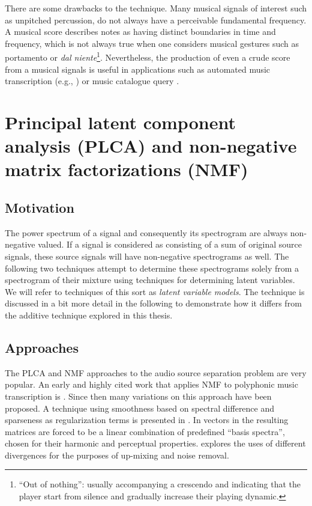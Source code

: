 There are some drawbacks to the technique. Many musical signals of interest such
as unpitched percussion, do not always have a perceivable fundamental
frequency. A musical score describes notes as having distinct boundaries in time
and frequency, which is not always true when one considers
musical gestures such as portamento or \textit{dal niente}\footnote{``Out of
    nothing'': usually accompanying a crescendo and indicating that the player
start from silence and gradually increase their playing dynamic.}. Nevertheless,
the production of even a crude score from a musical signals is useful in
applications such as automated music transcription (e.g.,
\cite{ryynanen2008automatic}) or music catalogue query
\cite{mcnab1996towards}.

\section{Principal latent component analysis (PLCA) and non-negative matrix
factorizations (NMF)}

\subsection{Motivation}

The power spectrum of a signal and consequently its spectrogram are always
non-negative valued. If a signal is considered as consisting of a sum of
original source signals, these source signals will have non-negative
spectrograms as well. The following two techniques attempt to determine these
spectrograms solely from a spectrogram of their mixture using techniques for
determining latent variables. We will refer to techniques of this sort as
\textit{latent variable models}. The technique is discussed in a bit more detail
in the following to demonstrate how it differs from the additive technique
explored in this thesis.

\subsection{Approaches}

The PLCA and NMF approaches to the audio source separation problem are very
popular. An early and highly cited work that applies NMF to polyphonic music
transcription is \cite{smaragdis2003non}. Since then many variations on this
approach have been proposed. A technique using smoothness based on spectral
difference and sparseness as regularization terms is presented in
\cite{virtanen2007monaural}. In \cite{vincent2008harmonic} vectors in the
resulting matrices are forced to be a linear combination of predefined ``basis
spectra'', chosen for their harmonic and perceptual properties.
\cite{bertin2010enforcing} explores the uses of different divergences for the
purposes of up-mixing and noise removal.

